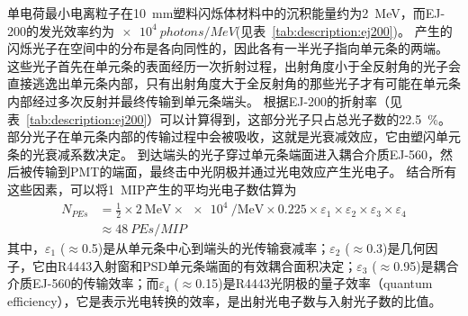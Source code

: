 单电荷最小电离粒子在\SI{10}{mm}塑料闪烁体材料中的沉积能量约为\SI{2}{MeV}，而EJ-200的发光效率约为$\SI{e4}{photons/MeV}$(见表~\ref{tab:description:ej200})。
产生的闪烁光子在空间中的分布是各向同性的，因此各有一半光子指向单元条的两端。
这些光子首先在单元条的表面经历一次折射过程，出射角度小于全反射角的光子会直接逃逸出单元条内部，只有出射角度大于全反射角的那些光子才有可能在单元条内部经过多次反射并最终传输到单元条端头。
根据EJ-200的折射率（见表~\ref{tab:description:ej200}）可以计算得到，这部分光子只占总光子数的\SI{22.5}{\percent}。
部分光子在单元条内部的传输过程中会被吸收，这就是光衰减效应，它由塑闪单元条的光衰减系数决定。
到达端头的光子穿过单元条端面进入耦合介质EJ-560，然后被传输到PMT的端面，最终击中光阴极并通过光电效应产生光电子。
结合所有这些因素，可以将\SI{1}{MIP}产生的平均光电子数估算为
\begin{align}
 N_{PEs} &= \frac{1}{2} \times \SI[per-mode=symbol]{2}{\mega\electronvolt} \times \SI{e4}{\per\mega\electronvolt} \times 0.225
           \times \varepsilon_{1} \times \varepsilon_{2} \times \varepsilon_{3} \times \varepsilon_{4} \nonumber \\
         &\approx \SI{48}{PEs\per{MIP}}
\label{eq:dynamic_range:pe_estimation}
\end{align}
其中，$\varepsilon_1$ ($\approx$0.5)是从单元条中心到端头的光传输衰减率；$\varepsilon_2$ ($\approx$0.3)是几何因子，它由R4443入射窗和PSD单元条端面的有效耦合面积决定；$\varepsilon_3$ ($\approx$0.95)是耦合介质EJ-560的传输效率；而$\varepsilon_4$ ($\approx$0.15)是R4443光阴极的量子效率（quantum efficiency），它是表示光电转换的效率，是出射光电子数与入射光子数的比值。

